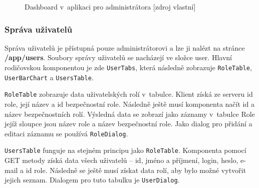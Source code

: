     \begin{figure}[ht]
    \begin{center}
    \caption{Dashboard v~aplikaci pro administrátora [zdroj vlastní]}
    \label{dashboardObrazek}
    \end{center}
    \end{figure}


\subsubsection *{Správa uživatelů}

Správa uživatelů je přístupná pouze administrátorovi a lze ji nalézt na stránce \textbf{/app/users}. Soubory správy uživatelů se nacházejí ve složce user. Hlavní rodičovskou komponentou je zde \texttt{UserTabs}, která následně zobrazuje \texttt{RoleTable}, \texttt{UserBarChart} a \texttt{UsersTable}. 

\texttt{RoleTable} zobrazuje data uživatelských rolí v~tabulce. Klient získá ze serveru id role, její název a id bezpečnostní role. Následně ještě musí komponenta načít id a název bezpečnostních rolí. Výsledná data se zobrazí jako záznamy v~tabulce Role jejíž sloupce jsou název role a název bezpečnostní role. Jako dialog pro přidání a editaci záznamu se používá \texttt{RoleDialog}.

\texttt{UsersTable} funguje na stejném principu jako \texttt{RoleTable}. Komponenta pomocí GET metody získá data všech uživatelů – id, jméno a příjmení, login, heslo, e-mail a id role. Následně se ještě musí získat data rolí, aby bylo možné vytvořit jejich seznam. Dialogem pro tuto tabulku je \texttt{UserDialog}.

